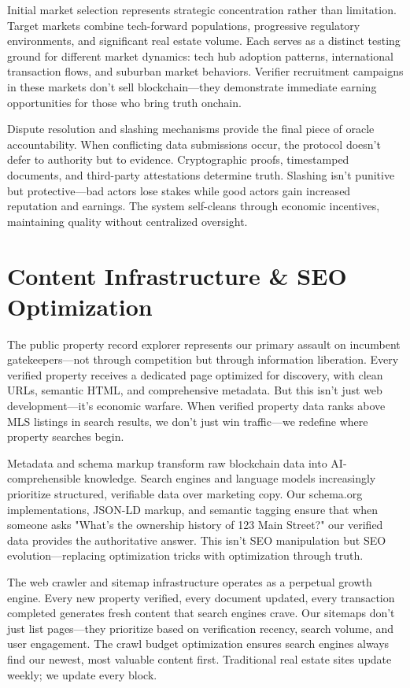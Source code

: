 Initial market selection represents strategic concentration rather than limitation. Target markets combine tech-forward populations, progressive regulatory environments, and significant real estate volume. Each serves as a distinct testing ground for different market dynamics: tech hub adoption patterns, international transaction flows, and suburban market behaviors. Verifier recruitment campaigns in these markets don't sell blockchain—they demonstrate immediate earning opportunities for those who bring truth onchain.

Dispute resolution and slashing mechanisms provide the final piece of oracle accountability. When conflicting data submissions occur, the protocol doesn't defer to authority but to evidence. Cryptographic proofs, timestamped documents, and third-party attestations determine truth. Slashing isn't punitive but protective—bad actors lose stakes while good actors gain increased reputation and earnings. The system self-cleans through economic incentives, maintaining quality without centralized oversight.

\section{Content Infrastructure & SEO Optimization}

The public property record explorer represents our primary assault on incumbent gatekeepers—not through competition but through information liberation. Every verified property receives a dedicated page optimized for discovery, with clean URLs, semantic HTML, and comprehensive metadata. But this isn't just web development—it's economic warfare. When verified property data ranks above MLS listings in search results, we don't just win traffic—we redefine where property searches begin.

Metadata and schema markup transform raw blockchain data into AI-comprehensible knowledge. Search engines and language models increasingly prioritize structured, verifiable data over marketing copy. Our schema.org implementations, JSON-LD markup, and semantic tagging ensure that when someone asks "What's the ownership history of 123 Main Street?" our verified data provides the authoritative answer. This isn't SEO manipulation but SEO evolution—replacing optimization tricks with optimization through truth.

The web crawler and sitemap infrastructure operates as a perpetual growth engine. Every new property verified, every document updated, every transaction completed generates fresh content that search engines crave. Our sitemaps don't just list pages—they prioritize based on verification recency, search volume, and user engagement. The crawl budget optimization ensures search engines always find our newest, most valuable content first. Traditional real estate sites update weekly; we update every block.

